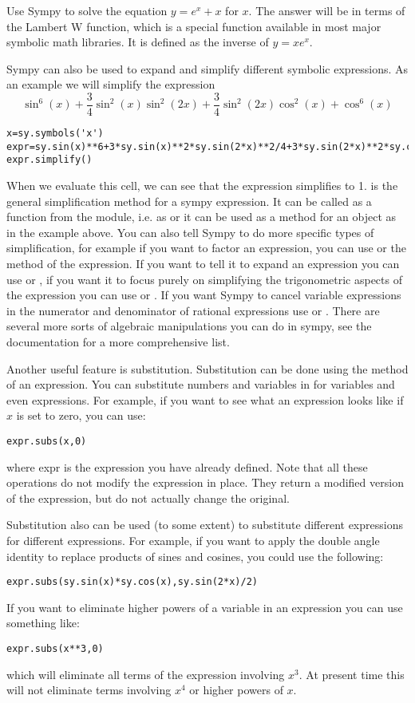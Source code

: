 \begin{problem}
Use Sympy to solve the equation $y=e^x+x$ for $x$.
The answer will be in terms of the Lambert W function, which is a special function available in most major symbolic math libraries.
It is defined as the inverse of $y=x e^x$.
\end{problem}

Sympy can also be used to expand and simplify different symbolic expressions.
As an example we will simplify the expression
$$\sin^6(x)+\frac{3}{4}\sin^2(x)\sin^2(2x)+\frac{3}{4}\sin^2(2x)\cos^2(x)+\cos^6(x)$$
\begin{lstlisting}
x=sy.symbols('x')
expr=sy.sin(x)**6+3*sy.sin(x)**2*sy.sin(2*x)**2/4+3*sy.sin(2*x)**2*sy.cos(x)**2/4+sy.cos(x)**6
expr.simplify()
\end{lstlisting}
When we evaluate this cell, we can see that the expression simplifies to 1.
 is the general simplification method for a sympy expression.
It can be called as a function from the module, i.e. as  or it can be used as a method for an object as in the example above.
You can also tell Sympy to do more specific types of simplification, for example if you want to factor an expression, you can use  or the  method of the expression.
If you want to tell it to expand an expression you can use  or , if you want it to focus purely on simplifying the trigonometric aspects of the expression you can use  or .
If you want Sympy to cancel variable expressions in the numerator and denominator of rational expressions use  or .
There are several more sorts of algebraic manipulations you can do in sympy, see the documentation for a more comprehensive list.

Another useful feature is substitution.
Substitution can be done using the  method of an expression.
You can substitute numbers and variables in for variables and even expressions.
For example, if you want to see what an expression looks like if $x$ is set to zero, you can use:
\begin{lstlisting}
expr.subs(x,0)
\end{lstlisting}
where expr is the expression you have already defined.
Note that all these operations do not modify the expression in place.
They return a modified version of the expression, but do not actually change the original.

Substitution also can be used (to some extent) to substitute different expressions for different expressions.
For example, if you want to apply the double angle identity to replace products of sines and cosines, you could use the following:
\begin{lstlisting}
expr.subs(sy.sin(x)*sy.cos(x),sy.sin(2*x)/2)
\end{lstlisting}
If you want to eliminate higher powers of a variable in an expression you can use something like:
\begin{lstlisting}
expr.subs(x**3,0)
\end{lstlisting}
which will eliminate all terms of the expression involving $x^3$.
At present time this will not eliminate terms involving $x^4$ or higher powers of $x$.

